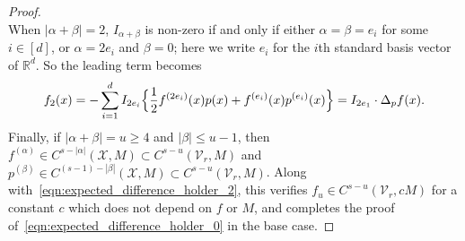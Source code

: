 \documentclass{article}
\newcommand{\Reals}{\mathbb{R}}
\newcommand{\abs}[1]{\left \lvert #1 \right \rvert}
\newcommand{\1}{\mathbf{1}}
\newcommand{\Xset}{\mathcal{X}}
\newcommand{\Vset}{\mathcal{V}}
\theoremstyle{alden}
\theoremstyle{aldenthm}
\theoremstyle{definition}
\theoremstyle{remark}
\begin{document}
\begin{proof}
\begin{equation*}
	\end{equation*}
	When $\abs{\alpha + \beta} = 2$, $I_{\alpha + \beta}$ is non-zero if and only if either $\alpha = \beta = e_i$ for some $i \in [d]$, or $\alpha = 2e_i$ and $\beta = 0$; here we write $e_i$ for the $i$th standard basis vector of $\Reals^d$. So the leading term becomes
	\begin{equation*}
	f_2(x) = -\sum_{i = 1}^{d} I_{2e_i}\Bigl\{\frac{1}{2}f^{(2e_i)}(x)p(x) + f^{(e_i)}(x)p^{(e_i)}(x)\Bigr\} = I_{2e_1} \cdot \Delta_pf(x).
	\end{equation*}
	Finally, if $\abs{\alpha + \beta} = u \geq 4$ and $\abs{\beta} \leq u - 1$, then $f^{(\alpha)} \in C^{s - \abs{\alpha}}(\Xset,M) \subset C^{s- u}(\Vset_r,M)$ and  $p^{(\beta)} \in C^{(s - 1) - \abs{\beta}}(\Xset,M) \subset C^{s - u}(\Vset_r,M)$. Along with~\eqref{eqn:expected_difference_holder_2}, this verifies $f_u \in C^{s - u}(\Vset_r,cM)$ for a constant $c$ which does not depend on $f$ or $M$, and completes the proof of~\eqref{eqn:expected_difference_holder_0} in the base case.
	

\end{proof}
\end{document}
